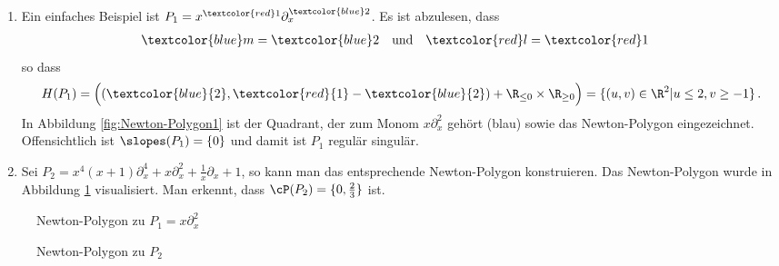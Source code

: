 \begin{exmp} \label{exmp:Newton-Polygon}
\begin{enumerate}
\item Ein einfaches Beispiel ist
$P_1=x^{\textcolor{red}1}\partial_x^{\textcolor{blue}2}$.  Es ist abzulesen,
dass
\begin{align*}
\textcolor{blue}m &= \textcolor{blue}2 &
\text{und}&&
\textcolor{red}l  &= \textcolor{red}1
\end{align*}
so dass
\[
H(P_1)=\Big( (\textcolor{blue}{2},\textcolor{red}{1}-\textcolor{blue}{2}) +
\R_{\leq 0}\times \R_{\geq 0} \Big) =\{(u,v)\in\R^2|u\leq 2, v\geq -1\} \,.
\]
In Abbildung \ref{fig:Newton-Polygon1} ist der Quadrant, der zum Monom
$x\partial_x^2$ gehört (blau) sowie das Newton-Polygon eingezeichnet.
Offensichtlich ist $\slopes(P_1)=\{0\}$ und damit ist $P_1$ regulär singulär.
\item
\begin{comment}
\cite[Bsp 5.3. 2.]{ZulaBarbara}
\end{comment}
Sei $P_2=x^4(x+1)\partial_x^4+x\partial_x^2+\frac{1}{x}\partial_x+1$, so kann
man das entsprechende Newton-Polygon konstruieren.
Das Newton-Polygon wurde in Abbildung \ref{fig:Newton-Polygon2} visualisiert.
Man erkennt, dass $\cP(P_2)=\{0,\frac{2}{3}\}$ ist.
\end{enumerate}
\begin{figure}[htbp] 
  \begin{minipage}[hbt]{0,49\textwidth}
  \begin{center}
  \end{center}
  \caption{Newton-Polygon zu $P_1=x\partial_x^2$}
  \label{fig:Newton-Polygon1}
  \end{minipage}
  \begin{minipage}[hbt]{0,49\textwidth}
  \begin{center}
  \end{center}
  \caption{Newton-Polygon zu $P_2$}
  \label{fig:Newton-Polygon2}
  \end{minipage}
\end{figure}
\end{exmp}

